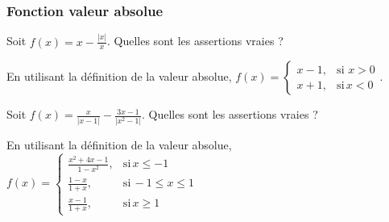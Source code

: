 \subsubsection{Fonction valeur absolue}


\begin{question} 
Soit $f(x)= x-\frac{|x|}{x}$. Quelles sont les assertions vraies ?
\begin{answers}

    
    
    
    

   
\end{answers}
\begin{explanations}
En utilisant la définition de la  valeur absolue, $f(x)=\left\{\begin{array}{cc}x-1,& \mbox{si} \, \, x >0 \\ x+1,& \mbox{si} \,  x <0  \end{array}\right.$.
\end{explanations}

\end{question}


\begin{question} 
Soit $f(x)= \frac{x}{|x-1|}-\frac{3x-1}{|x^2-1|}$. Quelles sont les assertions vraies ?
\begin{answers}

    
    
    
    


\end{answers}
\begin{explanations}
En utilisant la définition de la valeur absolue, 
 $f(x)=\left\{\begin{array}{ccc}\frac{x^2+4x-1}{1-x^2},& \mbox{si} \, x \le -1 \\ 
 \frac{1-x}{1+x} ,& \mbox{si} \,  -1\le x \le 1\\
   \frac{x-1}{1+x} ,& \mbox{si} \,  x \ge 1 \end{array}\right.$
\end{explanations}

\end{question}

